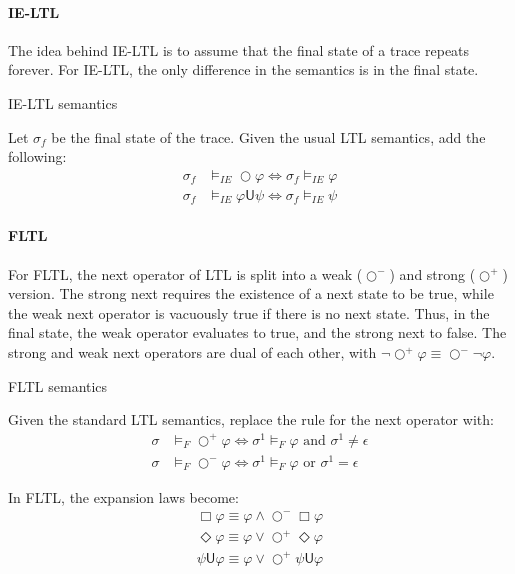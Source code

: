 \documentclass[a4paper]{article}
\newcommand{\U}{\mathsf{U}}
\newcommand{\tand}{\text{ and }}
\newcommand{\tor}{\text{ or }}
\begin{document}
\paragraph{IE-LTL} The idea behind IE-LTL is to assume that the final state of a trace repeats forever. For IE-LTL, the only difference in the semantics is in the final state.
\begin{defn}{IE-LTL semantics}

  Let $\sigma_f$ be the final state of the trace. Given the usual LTL semantics, add the following:
  \begin{align*}
    \sigma_f &\vDash_{IE} \bigcirc \varphi \iff \sigma_f \vDash_{IE} \varphi\\
    \sigma_f &\vDash_{IE} \varphi \U \psi \iff \sigma_f \vDash_{IE} \psi
  \end{align*}
\end{defn}

\newcommand{\sn}{\bigcirc^+}
\newcommand{\wn}{\bigcirc^-}

\paragraph{FLTL} For FLTL, the next operator of LTL is split into a weak ($\wn$) and strong ($\sn$) version.
The strong next requires the existence of a next state to be true, while the weak next operator is vacuously true if there is no next state.
Thus, in the final state, the weak operator evaluates to true, and the strong next to false. The strong and weak next operators are dual of each other, with  $\neg\sn\varphi \equiv \wn\neg\varphi$.
\begin{defn}{FLTL semantics}

  Given the standard LTL semantics, replace the rule for the next operator with:
  \begin{align*}
    \sigma&\vDash_F\sn\varphi \iff \sigma^1\vDash_F\varphi \tand \sigma^1 \neq \epsilon\\
    \sigma&\vDash_F\wn\varphi \iff \sigma^1\vDash_F\varphi \tor \sigma^1 = \epsilon
  \end{align*}
\end{defn}

\begin{lem}

  In FLTL, the expansion laws become:
  \begin{align}
    \Box \varphi \equiv \varphi \land \wn \Box \varphi \label{fltl-el1}\\
    \Diamond \varphi \equiv \varphi \lor \sn \Diamond \varphi\\
    \psi \U \varphi \equiv \varphi \lor \sn \psi \U \varphi
  \end{align}

\end{lem}
\end{document}
